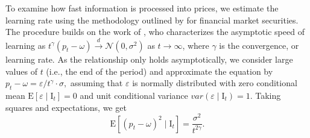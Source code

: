 \documentclass[webpdf,modern,medium]{oup-authoring-template}
\theoremstyle{thmstyleone}%
\theoremstyle{thmstyletwo}%
\theoremstyle{thmstylethree}%
\begin{document}
        To examine how fast information is processed into prices, we estimate the learning rate using the methodology outlined by \citet{biais1999} for financial market securities. The procedure builds on the work of \citet{vives1995}, who characterizes the asymptotic speed of learning as
        $t^\gamma\left(p_t - \omega\right) \xrightarrow[]{d} \mathcal{N}\left(0, \sigma^2\right)$ as $ t \rightarrow \infty$,
        where $\gamma$ is the convergence, or learning rate.
        As the relationship only holds asymptotically, we consider large values of $t$ (i.e., the end of the period) and approximate the equation by
        $    p_t - \omega = \varepsilon/t^\gamma \cdot \sigma,$
        assuming that $\varepsilon$ is normally distributed with zero conditional mean $\mathrm{E}\left[\varepsilon \mid \mathrm{I}_t \right] = 0$ and unit conditional variance $var(\varepsilon \mid \mathrm{I}_t) = 1$.
        Taking squares and expectations, we get
        \begin{equation}
            \label{eq:expres_1}
            \mathrm{E}\left[\left(p_t - \omega\right)^2 \mid \mathrm{I}_t\right] = \frac{\sigma^2}{t^{2 \gamma}}.
        \end{equation}
\end{document}
